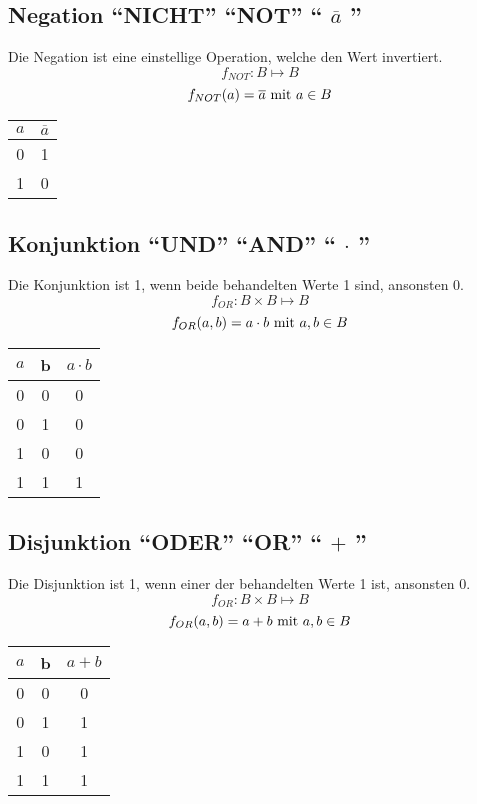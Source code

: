 \subsection{Negation "`NICHT"' "`NOT"' "` $\overline{a}$ "'}
Die Negation ist eine einstellige Operation, welche den Wert invertiert.
$$ f_{NOT}: B \mapsto B $$
$$ f_{NOT}(a) = \overline{a} \textnormal{ mit } a \in B$$

\begin{center}
\begin{tabular}{cc}
	$a$ & $\overline a$ \\ \hline
	0  & 1           \\
	1  & 0           \\
\end{tabular}
\end{center}

\subsection{Konjunktion "`UND"' "`AND"' "` $\cdot$ "'}
Die Konjunktion ist 1, wenn beide behandelten Werte 1 sind, ansonsten 0.
$$ f_{OR}: B \times B \mapsto B $$
$$ f_{OR}(a, b) = a \cdot b \textnormal{ mit } a, b \in B$$

\begin{center}
\begin{tabular}{ccc}
	$a$ & b & $a \cdot b$ \\ \hline
	 0  & 0 &    0    \\
	 0  & 1 &    0    \\
	 1  & 0 &    0    \\
	 1  & 1 &    1    \\
\end{tabular}
\end{center}

\subsection{Disjunktion "`ODER"' "`OR"' "` $+$ "'}
Die Disjunktion ist 1, wenn einer der behandelten Werte 1 ist, ansonsten 0.
$$ f_{OR}: B \times B \mapsto B $$
$$ f_{OR}(a, b) = a + b \textnormal{ mit } a, b \in B$$

\begin{center}
\begin{tabular}{ccc}
	$a$ & b & $a + b$ \\ \hline
	 0  & 0 &    0    \\
	 0  & 1 &    1    \\
	 1  & 0 &    1    \\
	 1  & 1 &    1    \\
\end{tabular}
\end{center}


